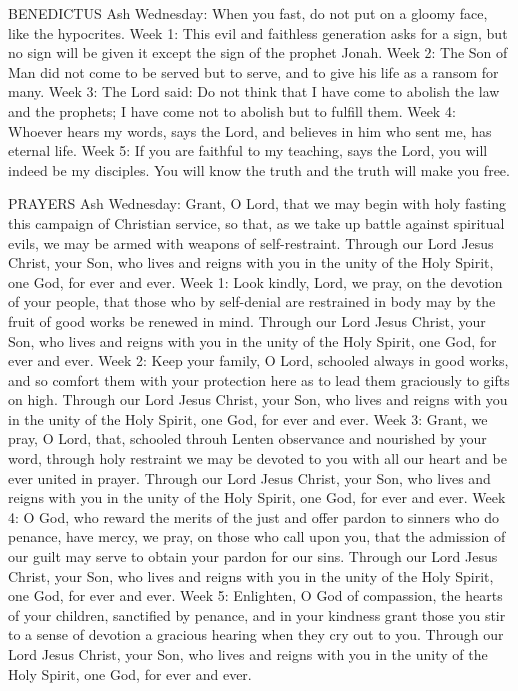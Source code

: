 BENEDICTUS
Ash Wednesday:	When you fast, do not put on a gloomy face, like the hypocrites.
Week 1:	This evil and faithless generation asks for a sign, but no sign will be given it except the sign of the prophet Jonah.
Week 2:	The Son of Man did not come to be served but to serve, and to give his life as a ransom for many.
Week 3:	The Lord said: Do not think that I have come to abolish the law and the prophets; I have come not to abolish but to fulfill them.
Week 4:	Whoever hears my words, says the Lord, and believes in him who sent me, has eternal life.
Week 5:	If you are faithful to my teaching, says the Lord, you will indeed be my disciples. You will know the truth and the truth will make you free.

PRAYERS
Ash Wednesday:	Grant, O Lord, that we may begin with holy fasting this campaign of Christian service, so that, as we take up battle against spiritual evils, we may be armed with weapons of self-restraint. Through our Lord Jesus Christ, your Son, who lives and reigns with you in the unity of the Holy Spirit, one God, for ever and ever.
Week 1:	Look kindly, Lord, we pray, on the devotion of your people, that those who by self-denial are restrained in body may by the fruit of good works be renewed in mind. Through our Lord Jesus Christ, your Son, who lives and reigns with you in the unity of the Holy Spirit, one God, for ever and ever.
Week 2:	Keep your family, O Lord, schooled always in good works, and so comfort them with your protection here as to lead them graciously to gifts on high. Through our Lord Jesus Christ, your Son, who lives and reigns with you in the unity of the Holy Spirit, one God, for ever and ever.
Week 3:	Grant, we pray, O Lord, that, schooled throuh Lenten observance and nourished by your word, through holy restraint we may be devoted to you with all our heart and be ever united in prayer. Through our Lord Jesus Christ, your Son, who lives and reigns with you in the unity of the Holy Spirit, one God, for ever and ever.
Week 4:	O God, who reward the merits of the just and offer pardon to sinners who do penance, have mercy, we pray, on those who call upon you, that the admission of our guilt may serve to obtain your pardon for our sins. Through our Lord Jesus Christ, your Son, who lives and reigns with you in the unity of the Holy Spirit, one God, for ever and ever.
Week 5:	Enlighten, O God of compassion, the hearts of your children, sanctified by penance, and in your kindness grant those you stir to a sense of devotion a gracious hearing when they cry out to you. Through our Lord Jesus Christ, your Son, who lives and reigns with you in the unity of the Holy Spirit, one God, for ever and ever.

